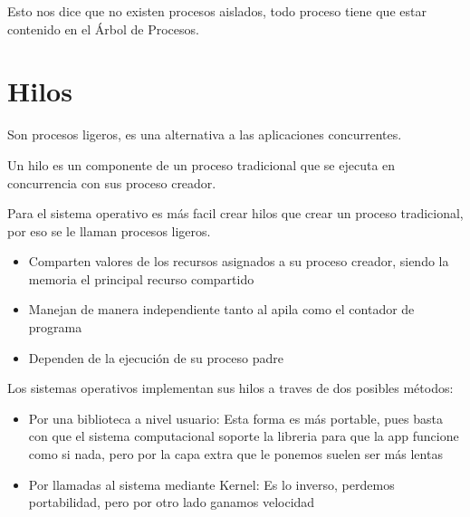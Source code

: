 \documentclass[12pt, fleqn]{report}                             %
\begin{document}
            Esto nos dice que no existen procesos aislados, todo proceso tiene que estar contenido en el
            Árbol de Procesos.





        \section{Hilos}

            Son procesos ligeros, es una alternativa a las aplicaciones concurrentes.

            Un hilo es un componente de un proceso tradicional que se ejecuta en concurrencia con
            sus proceso creador.

            Para el sistema operativo es más facil crear hilos que crear un proceso tradicional, por eso se
            le llaman procesos ligeros.

            \begin{itemize}
                \item Comparten valores de los recursos asignados a su proceso creador,
                    siendo la memoria el principal recurso compartido

                \item Manejan de manera independiente tanto al apila como el contador de programa
                
                \item Dependen de la ejecución de su proceso padre

            \end{itemize}

            Los sistemas operativos implementan sus hilos a traves de dos posibles métodos:
            \begin{itemize}

                \item Por una biblioteca a nivel usuario:
                    Esta forma es más portable, pues basta con que el sistema computacional soporte 
                    la libreria para que la app funcione como si nada, pero por la capa extra que le ponemos
                    suelen ser más lentas

                \item Por llamadas al sistema mediante Kernel:
                    Es lo inverso, perdemos portabilidad, pero por otro lado ganamos velocidad

            \end{itemize}
\end{document}
